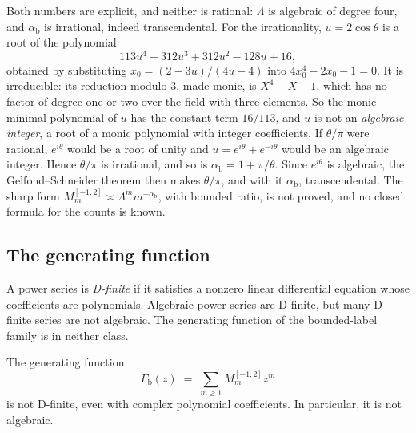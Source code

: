 Both numbers are explicit, and neither is rational: $\Lambda$ is algebraic of degree four, and
$\alpha_{\mathrm b}$ is irrational, indeed transcendental. For the irrationality, $u=2\cos\theta$ is a
root of the polynomial
\[ 113u^4-312u^3+312u^2-128u+16 , \]
obtained by substituting $x_0=(2-3u)/(4u-4)$ into $4x_0^4-2x_0-1=0$. It is irreducible: its reduction
modulo $3$, made monic, is $X^4-X-1$, which has no factor of degree one or two over the field with
three elements. So the monic minimal polynomial of $u$ has the constant term $16/113$, and $u$ is not an
\emph{algebraic integer}, a root of a monic polynomial with integer coefficients. If $\theta/\pi$ were
rational, $e^{i\theta}$ would be a root of unity and $u=e^{i\theta}+e^{-i\theta}$ would be an
algebraic integer. Hence $\theta/\pi$ is irrational, and so is $\alpha_{\mathrm b}=1+\pi/\theta$. Since
$e^{i\theta}$ is algebraic, the Gelfond--Schneider theorem then makes $\theta/\pi$, and with it
$\alpha_{\mathrm b}$, transcendental. The sharp form $M^{[-1,2]}_m\asymp\Lambda^mm^{-\alpha_{\mathrm b}}$, with
bounded ratio, is not proved, and no closed formula for the counts is known.

\subsection{The generating function}

A power series is \emph{D-finite} if it satisfies a nonzero linear differential equation whose
coefficients are polynomials. Algebraic power series are D-finite, but many D-finite series are not
algebraic. The generating function of the bounded-label family is in neither class.

\begin{corollary}\label{cor:bandnondfinite}
The generating function
\[ F_{\mathrm b}(z)\;=\;\sum_{m\ge1}M^{[-1,2]}_m z^m \]
is not D-finite, even with complex polynomial coefficients. In particular, it is not algebraic.
\end{corollary}

